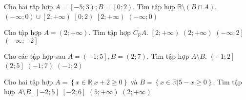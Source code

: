 \begin{ex}%
	Cho hai tâp hợp $A = \left[-5; 3\right); B = \left[0; 2\right)$. Tìm tập hợp $\mathbb{R} \setminus \left( B \cap A\right)$.
	\choice
	{\True $\left(-\infty; 0\right) \cup \left[2; +\infty\right)$}
	{$\left[0; 2\right)$}
	{$\left[2; +\infty\right)$}
	{$\left(-\infty; 0\right)$}
	\loigiai{Do $A \cap B = \left[0; 2\right)$ nên $\mathbb{R} \setminus (A \cap B) = (-\infty; 0) \cup [2; +\infty)$}
\end{ex}

\begin{ex}%
	Cho tập hợp $A=\left( 2;+\infty  \right)$. Tìm tập hợp $C_{\mathbb{R}} {A}$.  
	\choice
	{$\left[ 2;+\infty  \right)$}
	{$\left( 2;+\infty  \right)$}
	{\True $\left( -\infty ;2 \right]$}
	{$\left( -\infty ;-2 \right]$}
	\loigiai{
	}
\end{ex}

\begin{ex}%
	Cho các tập hợp sau $A =\left(-1; 5\right], B = \left(2; 7\right)$. Tìm tập hợp $A \setminus B$.
	\choice
	{\True $\left(-1; 2\right]$}
	{$\left(2; 5\right]$}
	{$\left(-1; 7\right)$}
	{$\left(-1; 2\right)$}
	\loigiai{
	}
\end{ex}

\begin{ex}%
	Cho hai tập hợp $A=\left\{ x\in \mathbb{R}\big| x+2\geq 0 \right\}$ và $B=\left\{ x\in \mathbb{R}\big| 5-x\geq 0 \right\}$. Tìm tập hợp $A \setminus B$. 
	\choice
	{$\left[ -2;5 \right]$}
	{$\left[ -2;6 \right]$}
	{\True $\left( 5;+\infty  \right)$}
	{$\left( 2;+\infty  \right)$}
\end{ex}

